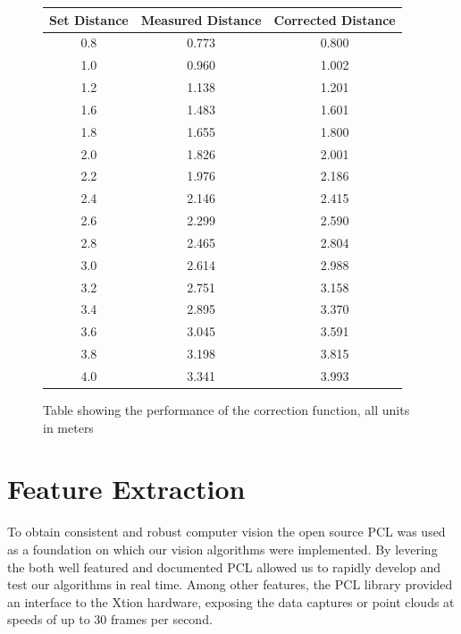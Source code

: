 \documentclass[]{article}
\begin{document}
{\begin{figure}[htb]
	\begin{center}
	\begin{tabular}{ccc}
		\hline

		\hline
		\textbf{Set Distance}& \textbf{Measured Distance}& \textbf{Corrected Distance} \\
		\hline
		0.8		& 0.773	& 0.800\\
		1.0		& 0.960	& 1.002\\
		1.2 	& 1.138	& 1.201\\
		1.6 	& 1.483	& 1.601\\
		1.8 	& 1.655	& 1.800\\
		2.0 	& 1.826	& 2.001\\
		2.2 	& 1.976	& 2.186\\
		2.4 	& 2.146	& 2.415\\
		2.6 	& 2.299	& 2.590\\
		2.8 	& 2.465	& 2.804\\
		3.0 	& 2.614	& 2.988\\
		3.2 	& 2.751	& 3.158\\
		3.4 	& 2.895	& 3.370\\
		3.6 	& 3.045	& 3.591\\
		3.8 	& 3.198	& 3.815\\
		4.0 	& 3.341	& 3.993\\
		\hline

		\hline
	\end{tabular}
	\end{center}
	\caption{Table showing the performance of the correction function, all units in meters}
	\label{tab:averages}
\end{figure}


\clearpage


\section{Feature Extraction} %
\label{sec:feature_extraction}

To obtain consistent and robust computer vision the open source PCL was used as a foundation on which our vision algorithms were implemented. By levering the both well featured and documented PCL allowed us to rapidly develop and test our algorithms in real time. Among other features, the PCL library provided an interface to the Xtion hardware, exposing the data captures or point clouds at speeds of up to 30 frames per second.

}
\end{document}
